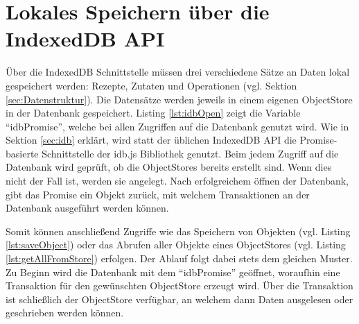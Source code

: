 \documentclass[a4paper, 12pt]{scrreprt}
\begin{document}
\begin{minipage}{\linewidth}
	
\end{minipage}

\begin{minipage}{\linewidth}
	
\end{minipage}



\section{Lokales Speichern über die IndexedDB API}
\label{sec:lokalesIndexeddb}

Über die IndexedDB Schnittstelle müssen drei verschiedene Sätze an Daten lokal gespeichert werden: Rezepte, Zutaten und Operationen (vgl. Sektion \ref{sec:Datenstruktur}). Die Datensätze werden jeweils in einem eigenen ObjectStore in der Datenbank gespeichert. Listing \ref{lst:idbOpen} zeigt die Variable \enquote{idbPromise}, welche bei allen Zugriffen auf die Datenbank genutzt wird. Wie in Sektion \ref{sec:idb} erklärt, wird statt der üblichen IndexedDB API die Promise-basierte Schnittstelle der idb.js Bibliothek genutzt. Beim jedem Zugriff auf die Datenbank wird geprüft, ob die ObjectStores bereits erstellt sind. Wenn dies nicht der Fall ist, werden sie angelegt. Nach erfolgreichem öffnen der Datenbank, gibt das Promise ein Objekt zurück, mit welchem Transaktionen an der Datenbank ausgeführt werden können.

\begin{minipage}{\linewidth}
	
\end{minipage}

Somit können anschließend Zugriffe wie das Speichern von Objekten (vgl. Listing \ref{lst:saveObject}) oder das Abrufen aller Objekte eines ObjectStores (vgl. Listing \ref{lst:getAllFromStore}) erfolgen. Der Ablauf folgt dabei stets dem gleichen Muster. Zu Beginn wird die Datenbank mit dem \enquote{idbPromise} geöffnet, woraufhin eine Transaktion für den gewünschten ObjectStore erzeugt wird. Über die Transaktion ist schließlich der ObjectStore verfügbar, an welchem dann Daten ausgelesen oder geschrieben werden können.
\end{document}
